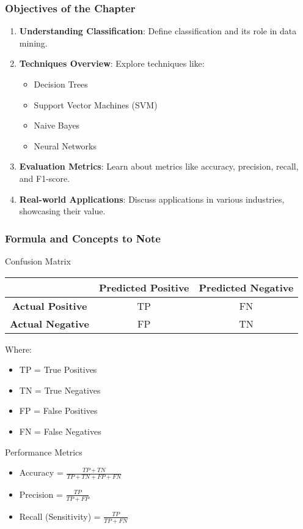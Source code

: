\documentclass{beamer}
\begin{document}
\begin{frame}[fragile]
    \frametitle{Objectives of the Chapter}
    \begin{enumerate}
        \item \textbf{Understanding Classification}: Define classification and its role in data mining.
        \item \textbf{Techniques Overview}: Explore techniques like:
        \begin{itemize}
            \item Decision Trees
            \item Support Vector Machines (SVM)
            \item Naive Bayes
            \item Neural Networks
        \end{itemize}
        \item \textbf{Evaluation Metrics}: Learn about metrics like accuracy, precision, recall, and F1-score.
        \item \textbf{Real-world Applications}: Discuss applications in various industries, showcasing their value.
    \end{enumerate}
\end{frame}

\begin{frame}[fragile]
    \frametitle{Formula and Concepts to Note}
    \begin{block}{Confusion Matrix}
        \begin{center}
        \begin{tabular}{|c|c|c|}
            \hline
               & \textbf{Predicted Positive} & \textbf{Predicted Negative} \\
            \hline
            \textbf{Actual Positive} & TP & FN \\
            \hline
            \textbf{Actual Negative} & FP & TN \\
            \hline
        \end{tabular}
        \end{center}
        Where:
        \begin{itemize}
            \item TP = True Positives
            \item TN = True Negatives
            \item FP = False Positives
            \item FN = False Negatives
        \end{itemize}
    \end{block}
    
    \begin{block}{Performance Metrics}
        \begin{itemize}
            \item Accuracy = $\frac{TP + TN}{TP + TN + FP + FN}$
            \item Precision = $\frac{TP}{TP + FP}$
            \item Recall (Sensitivity) = $\frac{TP}{TP + FN}$
        \end{itemize}
    \end{block}
\end{frame}
\end{document}

